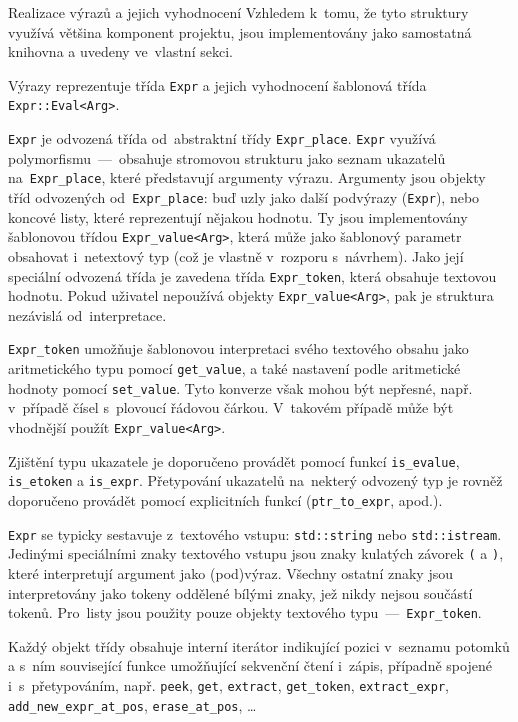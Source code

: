 \documentclass[thesis=M,czech]{FITthesis}[2012/06/26]
\newcommand{\id}[1]{\texttt{#1}}
\begin{document}
\begin{section}{Realizace výrazů a jejich vyhodnocení}
\label{s:impl:exprs}
Vzhledem k~tomu, že tyto struktury využívá většina komponent projektu,
jsou implementovány jako samostatná knihovna
a uvedeny ve~vlastní sekci.

Výrazy reprezentuje třída \id{Expr}
a jejich vyhodnocení šablonová třída \id{Expr::\-Eval<Arg>}.


\begin{paragraph}{\id{Expr}}\label{p:impl:exprs:expr}
je odvozená třída od~abstraktní třídy \id{Expr\_\-place}.
\id{Expr} využívá polymorfismu~---~obsahuje
stromovou strukturu jako seznam ukazatelů na~\id{Expr\_\-place},
které představují argumenty výrazu.
Argumenty jsou objekty tříd odvozených od~\id{Expr\_\-place}:
buď uzly jako další podvýrazy (\id{Expr}),
nebo koncové listy, které reprezentují nějakou hodnotu.
Ty jsou implementovány šablonovou třídou \id{Expr\_\-value<Arg>},
která může jako šablonový parametr obsahovat i~netextový typ
(což je vlastně v~rozporu s~návrhem).
Jako její speciální odvozená třída je zavedena
třída \id{Expr\_\-token}, která obsahuje textovou hodnotu.
Pokud uživatel nepoužívá objekty
\id{Expr\_\-value<Arg>},
pak je struktura nezávislá od~interpretace.

\id{Expr\_\-token} umožňuje šablonovou
interpretaci svého textového obsahu
jako aritmetického typu pomocí \id{get\_\-value},
a také nastavení podle aritmetické hodnoty pomocí \id{set\_\-value}.
Tyto konverze však mohou být nepřesné,
např. v~případě čísel s~plovoucí řádovou čárkou.
V~takovém případě může být vhodnější použít \id{Expr\_\-value<Arg>}.

Zjištění typu ukazatele je doporučeno provádět pomocí funkcí
\id{is\_\-evalue}, \id{is\_\-etoken} a \id{is\_\-expr}.
Přetypování ukazatelů na~nekterý odvozený typ
je rovněž doporučeno provádět pomocí explicitních funkcí
(\id{ptr\_\-to\_\-expr}, apod.).

\id{Expr} se typicky sestavuje z~textového vstupu:
\id{std::\-string} nebo \id{std::\-istream}.
Jedinými speciálními znaky textového vstupu
jsou znaky kulatých závorek \id{(} a \id{)},
které interpretují argument jako (pod)výraz.
Všechny ostatní znaky jsou interpretovány jako tokeny
oddělené bílými znaky, jež nikdy nejsou součástí tokenů.
Pro~listy jsou použity pouze objekty
textového typu~---~\id{Expr\_\-token}.

Každý objekt třídy obsahuje interní iterátor
indikující pozici v~seznamu potomků
a s~ním související funkce
umožňující sekvenční čtení i~zápis,
případně spojené i~s~přetypováním,
např. \id{peek}, \id{get}, \id{extract},
\id{get\_\-token}, \id{extract\_\-expr},
\id{add\_\-new\_\-expr\_\-at\_\-pos},
\id{erase\_\-at\_\-pos}, \dots


\end{paragraph}
\end{section}
\end{document}
